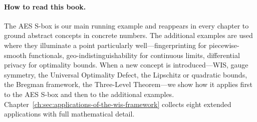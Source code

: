 \paragraph{How to read this book.}
The AES S-box is our main running example and reappears in every
chapter to ground abstract concepts in concrete numbers.
The additional examples are used where they illuminate a point
particularly well---fingerprinting for piecewise-smooth functionals,
geo-indistinguishability for continuous limits, differential privacy
for optimality bounds.  When a new concept is introduced---WIS,
gauge symmetry, the Universal Optimality Defect, the Lipschitz or
quadratic bounds, the Bregman framework, the Three-Level Theorem---we
show how it applies first to the AES S-box and then to the additional
examples.
Chapter~\ref{ch:sec:applications-of-the-wis-framework} collects eight
extended applications with full mathematical detail.
